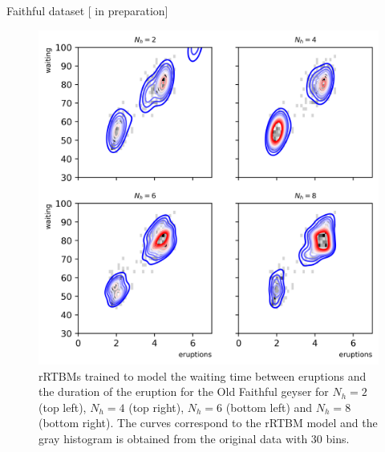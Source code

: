 \documentclass[10pt]{beamer}
\begin{document}
\begin{frame}{Faithful dataset \hfill \small [\cite{new} in preparation]}

    \begin{figure}
        \includegraphics[scale=0.7]{figures/faithful.png}
       
            \caption{\scriptsize rRTBMs trained to model the waiting time between eruptions and the duration of the eruption for the Old Faithful geyser for $N_h = 2$ (top left), $N_h = 4$ (top right), $N_h = 6$ (bottom left) and $N_h = 8$ (bottom right).
            The curves correspond to the rRTBM model and the gray histogram is obtained from the original data with 30 bins.}
    \end{figure}
    
    
\end{frame}
\end{document}
